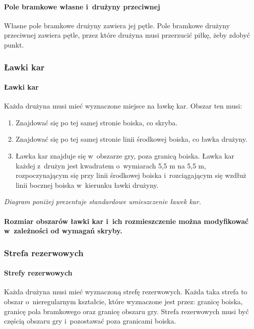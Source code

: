 \documentclass[12pt]{article}
\begin{document}
\paragraph{Pole bramkowe własne i~drużyny przeciwnej}
Własne pole bramkowe drużyny zawiera jej pętle. Pole bramkowe drużyny
przeciwnej zawiera pętle, przez które drużyna musi przerzucić piłkę,
żeby zdobyć punkt.

\subsubsection{Ławki kar}

\paragraph{Ławki kar}
Każda drużyna musi mieć wyznaczone miejsce
na ławkę kar. Obszar ten musi:
\begin{enumerate}
	\item Znajdować się po tej samej stronie boiska, co skryba.

	\item Znajdować się po tej samej stronie linii środkowej boiska, co ławka
	      drużyny.

	\item Ławka kar znajduje się w~obszarze gry, poza granicą boiska. Ławka kar
	      każdej z~drużyn jest kwadratem o~wymiarach 5,5 m na 5,5 m,
	      rozpoczynającym się przy linii środkowej boiska i~rozciągającym się
	      wzdłuż linii bocznej boiska w~kierunku ławki drużyny.
\end{enumerate}

\textit{Diagram poniżej prezentuje standardowe umieszczenie ławek kar.}

\paragraph{Rozmiar obszarów ławki kar i~ich rozmieszczenie można
	modyfikować w~zależności od wymagań skryby.}

\subsubsection{Strefa rezerwowych}

\paragraph{Strefy rezerwowych}
Każda drużyna musi mieć
wyznaczoną strefę rezerwowych. Każda taka strefa to obszar o~nieregularnym kształcie, które wyznaczone jest przez: granicę boiska,
granicę pola bramkowego oraz granicę obszaru gry. Strefa rezerwowych
musi być częścią obszaru gry i~pozostawać poza granicami boiska.
\end{document}

